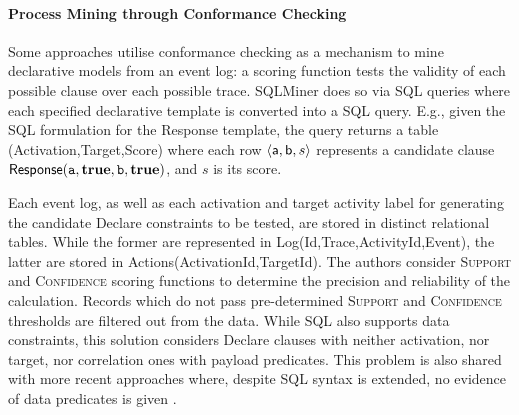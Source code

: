 \paragraph*{Process Mining through Conformance Checking}
Some approaches utilise conformance checking as a mechanism to mine declarative {models}  from an event log: a scoring function tests %
the validity of each possible clause over each possible trace. %
SQLMiner \cite{SchonigRCJM16} {does so via} SQL queries \cite{Schonig15} {where e}ach specified declarative {template} %
{is} converted into a SQL query. E.g., given the SQL formulation for the \textsf{Response} template, the query returns a table \textsf{(Activation,Target,Score)} where each row $\braket{\textsf{a},\textsf{b},s}$ represents a candidate clause $\textsf{Response}(\texttt{a},\textbf{true},\texttt{b},\textbf{true})$, and $s$ is its score.

Each event log, as well as each activation and target activity label for generating the candidate Declare constraints to be tested, are stored in distinct relational tables. While the former are represented in  \textsf{Log(Id,Trace,ActivityId,Event)}, the latter are stored in \textsf{Actions(ActivationId,TargetId)}. The authors consider 
\textsc{Support} and \textsc{Confidence} scoring functions to determine the precision and reliability of the calculation. Records which do not pass pre-determined \textsc{Support} and \textsc{Confidence} thresholds are filtered out from the data. While SQL also supports data constraints, this solution considers Declare clauses with neither activation, nor target, %
nor correlation ones with payload predicates. This problem is also shared with  more recent approaches where, despite SQL syntax is extended, no evidence of data predicates is given \cite{Polyvyanyy2022}. 

